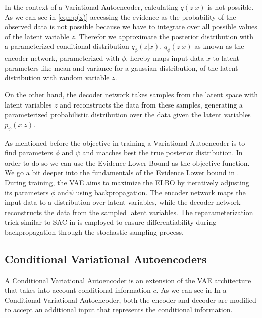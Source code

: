 In the context of a Variational Autoencoder, calculating $q(z|x)$ is not possible. As we can see in \eqref{eqn:p(x)} accessing the evidence as the probability of the observed data is not possible because we have to integrate over all possible values of the latent variable $z$. Therefor we approximate the posterior distribution with a parameterized conditional distribution $q_\phi(z|x)$. $q_\phi(z|x)$ as known as the encoder network, parameterized with $\phi$, hereby maps input data $x$ to latent parameters like mean and variance for a gaussian distribution, of the latent distribution with random variable $z$. 

On the other hand, the decoder network takes samples from the latent space with latent variables $z$ and reconstructs the data from these samples, generating a parameterized probabilistic distribution over the data given the latent variables $p_\psi(x|z)$. 

As mentioned before the objective in training a Variational Autoencoder is to find parameters $\phi$ and $\psi$ and matches best the true posterior distribution. In order to do so we can use the Evidence Lower Bound as the objective function. We go a bit deeper into the fundamentals of the Evidence Lower bound in . \\
During training, the VAE aims to maximize the ELBO by iteratively adjusting its parameters $\phi$ and$\psi$ using backpropagation. The encoder network maps the input data to a distribution over latent variables, while the decoder network reconstructs the data from the sampled latent variables. The reparameterization trick similar to SAC in  is employed to ensure differentiability during backpropagation through the stochastic sampling process. 



\subsection{Conditional Variational Autoencoders}


A Conditional Variational Autoencoder is an extension of the VAE architecture that takes into account conditional information $c$. As we can see in In a Conditional Variational Autoencoder, both the encoder and decoder are modified to accept an additional input that represents the conditional information. 

